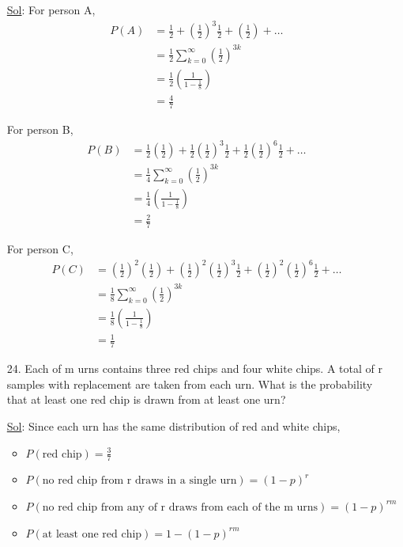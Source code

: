 \begin{enumerate}
    \underline{Sol}: For person A,
    \[
      \begin{aligned}
        P(A) &= \frac{1}{2} + (\frac{1}{2})^3 \frac{1}{2} +
        (\frac{1}{2}) + \dots \\
        &= \frac{1}{2} \sum_{k = 0}^{\infty} (\frac{1}{2})^{3k} \\
        &= \frac{1}{2} (\frac{1}{1 - \frac{1}{8}}) \\
        &= \boxed{\frac{4}{7}}
      \end{aligned}
    \]

    For person B,
    \[
      \begin{aligned}
        P(B) &= \frac{1}{2} (\frac{1}{2}) + \frac{1}{2}
        (\frac{1}{2})^3 \frac{1}{2} + \frac{1}{2} (\frac{1}{2})^6
        \frac{1}{2} + \dots \\
        &= \frac{1}{4} \sum_{k = 0}^{\infty} (\frac{1}{2})^{3k} \\
        &= \frac{1}{4} (\frac{1}{1 - \frac{1}{8}}) \\
        &= \boxed{\frac{2}{7}}
      \end{aligned}
    \]

    For person C,
    \[
      \begin{aligned}
        P(C) &= (\frac{1}{2})^2 (\frac{1}{2}) + (\frac{1}{2})^2
        (\frac{1}{2})^3 \frac{1}{2} + (\frac{1}{2})^2 (\frac{1}{2})^6
        \frac{1}{2} + \dots \\
        &= \frac{1}{8} \sum_{k=0}^{\infty} (\frac{1}{2})^{3k} \\
        &= \frac{1}{8} (\frac{1}{1 - \frac{1}{8}}) \\
        &= \boxed{\frac{1}{7}}
      \end{aligned}
    \]

  \item[24.] Each of m urns contains three red chips and four white
    chips. A total of r samples with replacement are taken from each
    urn. What is the probability that at least one red chip is drawn
    from at least one urn?

    \underline{Sol}: Since each urn has the same distribution of red
    and white chips,

    \begin{itemize}
      \item \(P(\textrm{red chip}) = \frac{3}{7}\)
      \item \(P(\textrm{no red chip from r draws in a single urn}) = (1 - p)^r\)
      \item \(P(\textrm{no red chip from any of r draws from each of
        the m urns}) = (1-p)^{rm}\)
      \item \(P(\textrm{at least one red chip}) = \boxed{1-(1-p)^{rm}}\)
    \end{itemize}

\end{enumerate}
